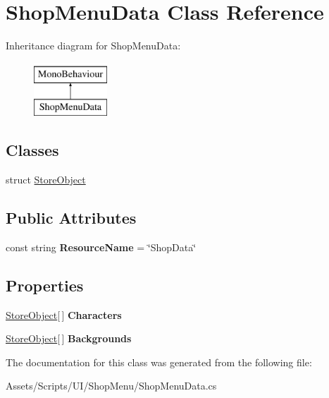 \hypertarget{class_shop_menu_data}{}\section{Shop\+Menu\+Data Class Reference}
\label{class_shop_menu_data}
Inheritance diagram for Shop\+Menu\+Data\+:\begin{figure}[H]
\begin{center}
\leavevmode
\includegraphics[height=2.000000cm]{class_shop_menu_data}
\end{center}
\end{figure}
\subsection*{Classes}
\begin{DoxyCompactItemize}
\item 
struct \hyperlink{struct_shop_menu_data_1_1_store_object}{Store\+Object}
\end{DoxyCompactItemize}
\subsection*{Public Attributes}
\begin{DoxyCompactItemize}
\item 
const string {\bfseries Resource\+Name} = \char`\"{}Shop\+Data\char`\"{}\hypertarget{class_shop_menu_data_a69778ab2d6c36c327b7a4af1b20ed45d}{}\label{class_shop_menu_data_a69778ab2d6c36c327b7a4af1b20ed45d}

\end{DoxyCompactItemize}
\subsection*{Properties}
\begin{DoxyCompactItemize}
\item 
\hyperlink{struct_shop_menu_data_1_1_store_object}{Store\+Object}\mbox{[}$\,$\mbox{]} {\bfseries Characters}\hypertarget{class_shop_menu_data_af3adba1c30bc6e484b77d9ce3dba98a8}{}\label{class_shop_menu_data_af3adba1c30bc6e484b77d9ce3dba98a8}

\item 
\hyperlink{struct_shop_menu_data_1_1_store_object}{Store\+Object}\mbox{[}$\,$\mbox{]} {\bfseries Backgrounds}\hypertarget{class_shop_menu_data_a7fedfe94d7dd4010887be5bd287c26b4}{}\label{class_shop_menu_data_a7fedfe94d7dd4010887be5bd287c26b4}

\end{DoxyCompactItemize}


The documentation for this class was generated from the following file\+:\begin{DoxyCompactItemize}
\item 
Assets/\+Scripts/\+U\+I/\+Shop\+Menu/Shop\+Menu\+Data.\+cs\end{DoxyCompactItemize}
